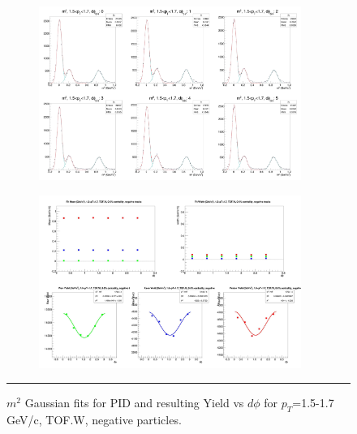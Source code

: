 \begin{figure}[H]
  \centering
    \begin{subfigure}{1\textwidth}
   \centering
   \includegraphics[width=0.94\textwidth]{lowptfits/yieldvsdphi_tof1_cent0_ch0_pT-15-17.jpg}
    \end{subfigure}
    \begin{subfigure}{1\textwidth}
   \centering
   \includegraphics[width=0.94\textwidth]{lowptfits/fitParams_tof1_cent0_ch0_pT-15-17.jpg}
    \end{subfigure}
    \rule{35em}{0.5pt}
  \caption[PID fits and Yield vs $d\phi$ for $p_T$=1.5-1.7 GeV/c, TOF.W, negative particles. ]{$m^2$ Gaussian fits for PID and resulting Yield vs $d\phi$ for $p_T$=1.5-1.7 GeV/c, TOF.W, negative particles.}
  \label{fig:fits15-17neg}
\end{figure}

